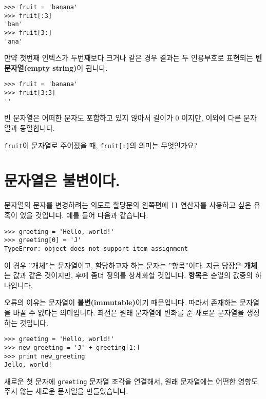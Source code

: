 \beforeverb
\begin{verbatim}
>>> fruit = 'banana'
>>> fruit[:3]
'ban'
>>> fruit[3:]
'ana'
\end{verbatim}
\afterverb
%

만약 첫번째 인텍스가 두번째보다 크거나 같은 경우 결과는 두 인용부호로 표현되는 {\bf 빈 문자열(empty string)}이 됩니다.


\beforeverb
\begin{verbatim}
>>> fruit = 'banana'
>>> fruit[3:3]
''
\end{verbatim}
\afterverb
%

빈 문자열은 어떠한 문자도 포함하고 있지 않아서 길이가 0 이지만, 이외에 다른 문자열과 동일합니다.

\begin{ex}
{\tt fruit}이 문자열로 주어졌을 때, {\tt fruit[:]}의 의미는 무엇인가요?



\end{ex}


\section{문자열은 불변이다.}

문자열의 문자를 변경하려는 의도로 할당문의 왼쪽편에 {\tt []} 연산자를 사용하고 싶은 유혹이 있을 것입니다.
예를 들어 다음과 같습니다.


\beforeverb
\begin{verbatim}
>>> greeting = 'Hello, world!'
>>> greeting[0] = 'J'
TypeError: object does not support item assignment
\end{verbatim}
\afterverb
%

이 경우 ''개체''는 문자열이고, 할당하고자 하는 문자는 ''항목''이다. 지금 당장은
{\bf 개체}는 값과 같은 것이지만, 후에 좀더 정의를 상세화할 것입니다.
{\bf 항목}은 순열의 값중의 하나입니다.


오류의 이유는 문자열이 {\bf 불변(immutable)}이기 때문입니다. 따라서 존재하는 문자열을 바꿀 수 없다는 의미입니다.
최선은 원래 문자열에 변화를 준 새로운 문자열을 생성하는 것입니다.

\beforeverb
\begin{verbatim}
>>> greeting = 'Hello, world!'
>>> new_greeting = 'J' + greeting[1:]
>>> print new_greeting
Jello, world!
\end{verbatim}
\afterverb
%
새로운 첫 문자에 {\tt greeting} 문자열 조각을 연결해서, 원래 문자열에는 어떤한 영향도 주지 않는 새로운 문자열을 만들었습니다.

